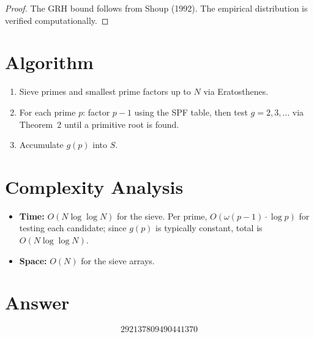 \documentclass[11pt]{article}
\theoremstyle{definition}
\begin{document}
\begin{proof}
The GRH bound follows from Shoup (1992). The empirical distribution is verified computationally.
\end{proof}

\section{Algorithm}

\begin{enumerate}
\item Sieve primes and smallest prime factors up to $N$ via Eratosthenes.
\item For each prime $p$: factor $p - 1$ using the SPF table, then test $g = 2, 3, \ldots$ via Theorem~2 until a primitive root is found.
\item Accumulate $g(p)$ into $S$.
\end{enumerate}

\section{Complexity Analysis}

\begin{itemize}
\item \textbf{Time:} $O(N \log \log N)$ for the sieve. Per prime, $O(\omega(p-1) \cdot \log p)$ for testing each candidate; since $g(p)$ is typically constant, total is $O(N \log \log N)$.
\item \textbf{Space:} $O(N)$ for the sieve arrays.
\end{itemize}

\section{Answer}

\[
\boxed{292137809490441370}
\]
\end{document}
